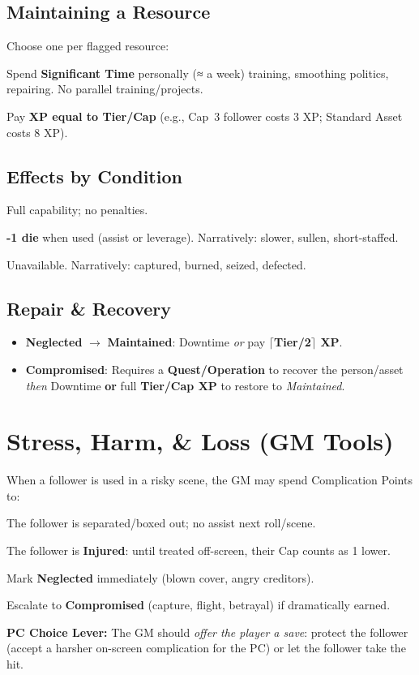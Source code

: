 \documentclass[12pt]{book}
\begin{document}
\subsection{Maintaining a Resource}
Choose one per flagged resource:
\begin{description}[leftmargin=3.2cm]
  \item[Downtime] Spend \textbf{Significant Time} personally (≈ a week) training, smoothing politics, repairing. No parallel training/projects.
  \item[XP Injection] Pay \textbf{XP equal to Tier/Cap} (e.g., Cap~3 follower costs 3 XP; Standard Asset costs 8 XP).
\end{description}

\subsection{Effects by Condition}
\begin{description}[leftmargin=3.2cm]
  \item[Maintained] Full capability; no penalties.
  \item[Neglected] \textbf{-1 die} when used (assist or leverage). Narratively: slower, sullen, short-staffed.
  \item[Compromised] Unavailable. Narratively: captured, burned, seized, defected.
\end{description}

\subsection{Repair \& Recovery}
\begin{itemize}
  \item \textbf{Neglected} $\rightarrow$ \textbf{Maintained}: Downtime \emph{or} pay \textbf{$\lceil$Tier/2$\rceil$ XP}.
  \item \textbf{Compromised}: Requires a \textbf{Quest/Operation} to recover the person/asset \emph{then} Downtime \textbf{or} full \textbf{Tier/Cap XP} to restore to \textit{Maintained}.
\end{itemize}

\section{Stress, Harm, \& Loss (GM Tools)}
When a follower is used in a risky scene, the GM may spend Complication Points to:
\begin{description}[leftmargin=3.2cm]
  \item[Pin] The follower is separated/boxed out; no assist next roll/scene.
  \item[Wound] The follower is \textbf{Injured}: until treated off-screen, their Cap counts as 1 lower.
  \item[Burn] Mark \textbf{Neglected} immediately (blown cover, angry creditors).
  \item[Seize] Escalate to \textbf{Compromised} (capture, flight, betrayal) if dramatically earned.
\end{description}
\textbf{PC Choice Lever:} The GM should \emph{offer the player a save}: protect the follower (accept a harsher on-screen complication for the PC) or let the follower take the hit.
\end{document}
